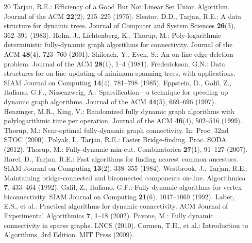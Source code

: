 \documentclass[runningheads]{llncs}
\begin{document}
\begin{thebibliography}{20}
 Tarjan, R.E.: Efficiency of a Good But Not Linear Set Union Algorithm. Journal of the ACM \textbf{22}(2), 215–225 (1975).
 Sleator, D.D., Tarjan, R.E.: A data structure for dynamic trees. Journal of Computer and System Sciences \textbf{26}(3), 362–391 (1983).
 Holm, J., Lichtenberg, K., Thorup, M.: Poly-logarithmic deterministic fully-dynamic graph algorithms for connectivity. Journal of the ACM \textbf{48}(4), 723–760 (2001).
 Shiloach, Y., Even, S.: An on-line edge-deletion problem. Journal of the ACM \textbf{28}(1), 1–4 (1981).
 Frederickson, G.N.: Data structures for on-line updating of minimum spanning trees, with applications. SIAM Journal on Computing \textbf{14}(4), 781–798 (1985).
 Eppstein, D., Galil, Z., Italiano, G.F., Nissenzweig, A.: Sparsification—a technique for speeding up dynamic graph algorithms. Journal of the ACM \textbf{44}(5), 669–696 (1997).
 Henzinger, M.R., King, V.: Randomized fully dynamic graph algorithms with polylogarithmic time per operation. Journal of the ACM \textbf{46}(4), 502–516 (1999).
 Thorup, M.: Near-optimal fully-dynamic graph connectivity. In: Proc. 32nd STOC (2000).
 Polyak, I., Tarjan, R.E.: Faster Bridge-finding. Proc. SODA (2012).
 Thorup, M.: Fully-dynamic min-cut. Combinatorica \textbf{27}(1), 91–127 (2007).
 Harel, D., Tarjan, R.E.: Fast algorithms for finding nearest common ancestors. SIAM Journal on Computing \textbf{13}(2), 338–355 (1984).
 Westbrook, J., Tarjan, R.E.: Maintaining bridge-connected and biconnected components on-line. Algorithmica \textbf{7}, 433–464 (1992).
 Galil, Z., Italiano, G.F.: Fully dynamic algorithms for vertex biconnectivity. SIAM Journal on Computing \textbf{21}(6), 1047–1069 (1992).
 Laber, E.S., et al.: Practical algorithms for dynamic connectivity. ACM Journal of Experimental Algorithmics \textbf{7}, 1–18 (2002).
 Pavone, M.: Fully dynamic connectivity in sparse graphs. LNCS (2010).
 Cormen, T.H., et al.: Introduction to Algorithms, 3rd Edition. MIT Press (2009).
\end{thebibliography}
\end{document}
